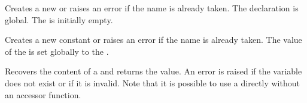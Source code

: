 \documentclass[oneside]{book}
\begin{document}
\begin{function}{\tlNew}
\begin{syntax}
 
\end{syntax}
Creates a new  or raises an error if the
name is already taken. The declaration is global. The
 is initially empty.
\begin{codehigh}
\tlNew \lFooSomeTl
\end{codehigh}
\end{function}

\begin{function}{\tlConst}
\begin{syntax}
  
\end{syntax}
Creates a new constant  or raises an error
if the name is already taken. The value of the
 is set globally to the .
\begin{codehigh}
\tlConst {}
\end{codehigh}
\end{function}

\begin{function}{\tlUse}
\begin{syntax}
 
\end{syntax}
Recovers the content of a  and returns the value.
An error is raised if the variable
does not exist or if it is invalid. Note that it is possible to use
a  directly without an accessor function.
\begin{codehigh}
\tlUse \lTmpbTl
\end{codehigh}
\end{function}
\end{document}
